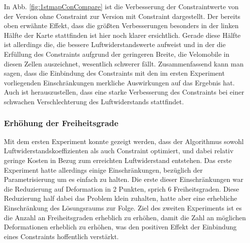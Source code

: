 In Abb. \cref{fig:1stmapConCompare} ist die Verbesserung der Constraintwerte von der Version ohne Constraint zur Version mit Constraint dargestellt.
Der bereits oben erwähnte Effekt, dass die größten Verbesserungen besonders in der linken Hälfte der Karte stattfinden ist hier noch klarer ersichtlich.
Gerade diese Hälfte ist allerdings die, die bessere Luftwiderstandswerte aufweist und in der die Erfüllung des Constraints aufgrund der geringeren Breite, die Velomobile in diesen Zellen auszeichnet, wesentlich schwerer fällt.
Zusammenfassend kann man sagen, dass die Einbindung des Constraints mit den im ersten Experiment vorliegenden Einschränkungen merkliche Auswirkungen auf das Ergebnis hat.
Auch ist herauszustellen, dass eine starke Verbesserung des Constraints bei einer schwachen Verschlechterung des Luftwiderstands stattfindet.

\subsubsection{Erhöhung der Freiheitsgrade}
\label{sub:exp2nd}
Mit dem ersten Experiment konnte gezeigt werden, dass der Algorithmus sowohl Luftwiderstandskoeffizienten als auch Constraint optimiert, und dabei relativ geringe Kosten in Bezug zum erreichten Luftwiderstand entstehen.
Das erste Experiment hatte allerdings einige Einschränkungen, bezüglich der Parametrisierung um es einfach zu halten.
Die erste dieser Einschränkungen war die Reduzierung auf Deformation in 2 Punkten, sprich 6 Freiheitsgraden.
Diese Reduzierung half dabei das Problem klein zuhalten, hatte aber eine erhebliche Einschränkung des Lösungsraums zur Folge.
Ziel des zweiten Experiments ist es die Anzahl an Freiheitsgraden erheblich zu erhöhen, damit die Zahl an möglichen Deformationen erheblich zu erhöhen, was den positiven Effekt der Einbindung eines Constraints hoffentlich verstärkt.

